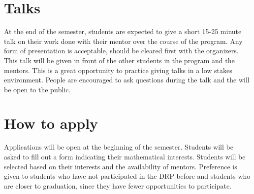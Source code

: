 \documentclass{article}
\begin{document}
\section{Talks}

At the end of the semester, students are expected to give a short 15-25 minute talk on their work
done with their mentor over the course of the program. Any form of presentation is acceptable,
should be cleared first with the organizers. This talk will be given in front of the other students
in the program and the mentors. This is a great opportunity to practice giving talks in a low
stakes environment. People are encouraged to ask questions during the talk and the will be open to
the public.

\section{How to apply}

Applications will be open at the beginning of the semester. Students will be asked to fill out a
form indicating their mathematical interests. Students will be selected based on their interests and
the availability of mentors. Preference is given to students who have not participated in the DRP
before and students who are closer to graduation, since they have fewer opportunities to
participate. 
\end{document}
